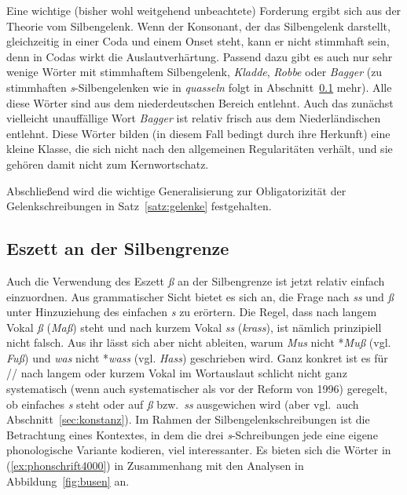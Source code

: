Eine wichtige (bisher wohl weitgehend unbeachtete) Forderung ergibt sich aus der Theorie vom Silbengelenk.
Wenn der Konsonant, der das Silbengelenk darstellt, gleichzeitig in einer Coda und einem Onset steht, kann er nicht stimmhaft sein, denn in Codas wirkt die Auslautverhärtung.
\label{abs:robbe}Passend dazu gibt es auch nur sehr wenige Wörter mit stimmhaftem Silbengelenk, \zB \textit{Kladde}, \textit{Robbe} oder \textit{Bagger} (zu stimmhaften \textit{s}-Silbengelenken wie in \textit{quasseln} folgt in Abschnitt~\ref{sec:eszett} mehr).
Alle diese Wörter sind aus dem niederdeutschen Bereich entlehnt.
Auch das zunächst vielleicht unauffällige Wort \textit{Bagger} ist relativ frisch aus dem Niederländischen entlehnt.
Diese Wörter bilden (in diesem Fall bedingt durch ihre Herkunft) eine kleine Klasse, die sich nicht nach den allgemeinen Regularitäten verhält, und sie gehören damit nicht zum Kernwortschatz.

Abschließend wird die wichtige Generalisierung zur Obligatorizität der Gelenkschreibungen in Satz~\ref{satz:gelenke} festgehalten.


\subsection[Eszett an der Silbengrenze]{\Opsional Eszett an der Silbengrenze}

\label{sec:eszett}

Auch die Verwendung des Eszett \textit{ß} an der Silbengrenze ist jetzt relativ einfach einzuordnen.
Aus grammatischer Sicht bietet es sich an, die Frage nach \textit{ss} und \textit{ß} unter Hinzuziehung des einfachen \textit{s} zu erörtern.
Die Regel, dass nach langem Vokal \textit{ß} (\textit{Maß}) steht und nach kurzem Vokal \textit{ss} (\textit{krass}), ist nämlich prinzipiell nicht falsch.
Aus ihr lässt sich aber nicht ableiten, warum \zB \textit{Mus} nicht *\textit{Muß} (vgl. \textit{Fuß}) und \textit{was} nicht *\textit{wass} (vgl. \textit{Hass}) geschrieben wird.
Ganz konkret ist es für // nach langem oder kurzem Vokal im Wortauslaut schlicht nicht ganz systematisch (wenn auch systematischer als vor der Reform von 1996) geregelt, ob einfaches \textit{s} steht oder auf \textit{ß} bzw.\ \textit{ss} ausgewichen wird (aber vgl.\ auch Abschnitt~\ref{sec:konstanz}).
Im Rahmen der Silbengelenkschreibungen ist die Betrachtung eines Kontextes, in dem die drei \textit{s}-Schreibungen jede eine eigene phonologische Variante kodieren, viel interessanter.
Es bieten sich die Wörter in (\ref{ex:phonschrift4000}) in Zusammenhang mit den Analysen in Abbildung~\ref{fig:busen} an.

